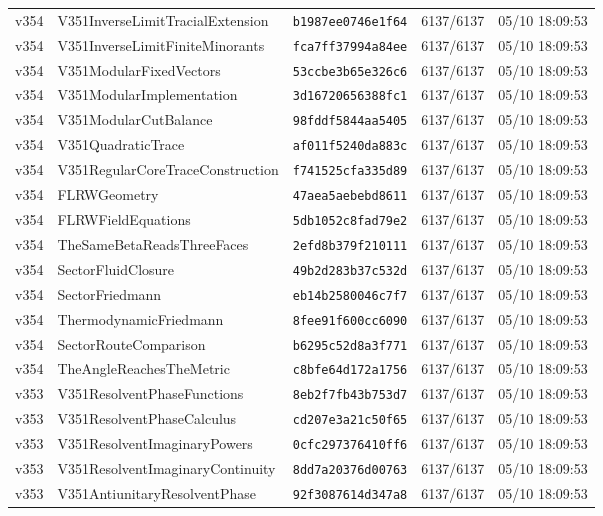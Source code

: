 \documentclass[11pt]{article}
\theoremstyle{definition}\newtheorem{deriv}{Derivation}
\begin{document}
{\begin{longtable}{@{}lllll@{}}
v354 & V351InverseLimitTracialExtension & \texttt{b1987ee0746e1f64} & 6137/6137 & 05/10 18:09:53 \\
v354 & V351InverseLimitFiniteMinorants & \texttt{fca7ff37994a84ee} & 6137/6137 & 05/10 18:09:53 \\
v354 & V351ModularFixedVectors & \texttt{53ccbe3b65e326c6} & 6137/6137 & 05/10 18:09:53 \\
v354 & V351ModularImplementation & \texttt{3d16720656388fc1} & 6137/6137 & 05/10 18:09:53 \\
v354 & V351ModularCutBalance & \texttt{98fddf5844aa5405} & 6137/6137 & 05/10 18:09:53 \\
v354 & V351QuadraticTrace & \texttt{af011f5240da883c} & 6137/6137 & 05/10 18:09:53 \\
v354 & V351RegularCoreTraceConstruction & \texttt{f741525cfa335d89} & 6137/6137 & 05/10 18:09:53 \\
v354 & FLRWGeometry & \texttt{47aea5aebebd8611} & 6137/6137 & 05/10 18:09:53 \\
v354 & FLRWFieldEquations & \texttt{5db1052c8fad79e2} & 6137/6137 & 05/10 18:09:53 \\
v354 & TheSameBetaReadsThreeFaces & \texttt{2efd8b379f210111} & 6137/6137 & 05/10 18:09:53 \\
v354 & SectorFluidClosure & \texttt{49b2d283b37c532d} & 6137/6137 & 05/10 18:09:53 \\
v354 & SectorFriedmann & \texttt{eb14b2580046c7f7} & 6137/6137 & 05/10 18:09:53 \\
v354 & ThermodynamicFriedmann & \texttt{8fee91f600cc6090} & 6137/6137 & 05/10 18:09:53 \\
v354 & SectorRouteComparison & \texttt{b6295c52d8a3f771} & 6137/6137 & 05/10 18:09:53 \\
v354 & TheAngleReachesTheMetric & \texttt{c8bfe64d172a1756} & 6137/6137 & 05/10 18:09:53 \\
v353 & V351ResolventPhaseFunctions & \texttt{8eb2f7fb43b753d7} & 6137/6137 & 05/10 18:09:53 \\
v353 & V351ResolventPhaseCalculus & \texttt{cd207e3a21c50f65} & 6137/6137 & 05/10 18:09:53 \\
v353 & V351ResolventImaginaryPowers & \texttt{0cfc297376410ff6} & 6137/6137 & 05/10 18:09:53 \\
v353 & V351ResolventImaginaryContinuity & \texttt{8dd7a20376d00763} & 6137/6137 & 05/10 18:09:53 \\
v353 & V351AntiunitaryResolventPhase & \texttt{92f3087614d347a8} & 6137/6137 & 05/10 18:09:53 \\

\end{longtable}}
\end{document}
